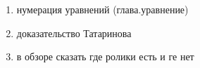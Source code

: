 \begin{enumerate}

    \item нумерация уравнений (глава.уравнение)

    \item доказательство Татаринова
    
    \item в обзоре сказать где ролики есть и ге нет

    
\end{enumerate}